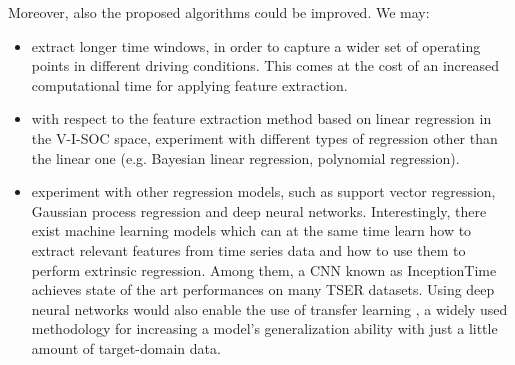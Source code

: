 Moreover, also the proposed algorithms could be improved. We may:
\begin{itemize}
    \item extract longer time windows, in order to capture a wider set of operating points in different driving conditions. This comes at the cost of an increased computational time for applying feature extraction.
    \item with respect to the feature extraction method based on linear regression in the V-I-SOC space, experiment with different types of regression other than the linear one (e.g. Bayesian linear regression, polynomial regression).
    \item experiment with other regression models, such as support vector regression, Gaussian process regression and deep neural networks. Interestingly, there exist machine learning models which can at the same time learn how to extract relevant features from time series data and how to use them to perform extrinsic regression. Among them, a CNN known as InceptionTime \cite{inceptiontime, TSER} achieves state of the art performances on many TSER datasets. Using deep neural networks would also enable the use of transfer learning \cite{transferlearning}, a widely used methodology for increasing a model's generalization ability with just a little amount of target-domain data.
\end{itemize}

